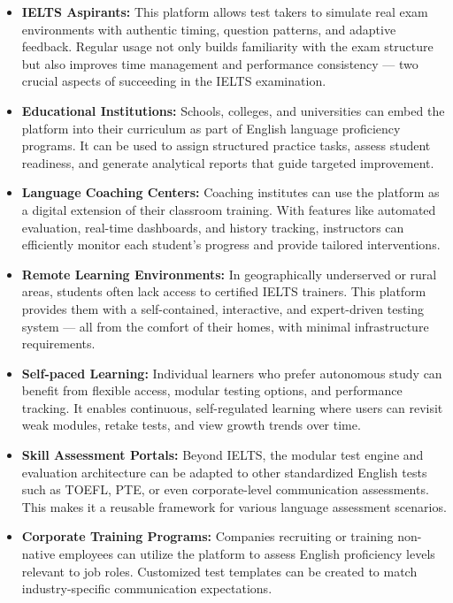 \documentclass[a4paper,12pt]{article}
\begin{document}
\begin{itemize}
    \item \textbf{IELTS Aspirants:} This platform allows test takers to simulate real exam environments with authentic timing, question patterns, and adaptive feedback. Regular usage not only builds familiarity with the exam structure but also improves time management and performance consistency — two crucial aspects of succeeding in the IELTS examination.

    \item \textbf{Educational Institutions:} Schools, colleges, and universities can embed the platform into their curriculum as part of English language proficiency programs. It can be used to assign structured practice tasks, assess student readiness, and generate analytical reports that guide targeted improvement.

    \item \textbf{Language Coaching Centers:} Coaching institutes can use the platform as a digital extension of their classroom training. With features like automated evaluation, real-time dashboards, and history tracking, instructors can efficiently monitor each student’s progress and provide tailored interventions.

    \item \textbf{Remote Learning Environments:} In geographically underserved or rural areas, students often lack access to certified IELTS trainers. This platform provides them with a self-contained, interactive, and expert-driven testing system — all from the comfort of their homes, with minimal infrastructure requirements.

    \item \textbf{Self-paced Learning:} Individual learners who prefer autonomous study can benefit from flexible access, modular testing options, and performance tracking. It enables continuous, self-regulated learning where users can revisit weak modules, retake tests, and view growth trends over time.

    \item \textbf{Skill Assessment Portals:} Beyond IELTS, the modular test engine and evaluation architecture can be adapted to other standardized English tests such as TOEFL, PTE, or even corporate-level communication assessments. This makes it a reusable framework for various language assessment scenarios.

    \item \textbf{Corporate Training Programs:} Companies recruiting or training non-native employees can utilize the platform to assess English proficiency levels relevant to job roles. Customized test templates can be created to match industry-specific communication expectations.


\end{itemize}
\end{document}
